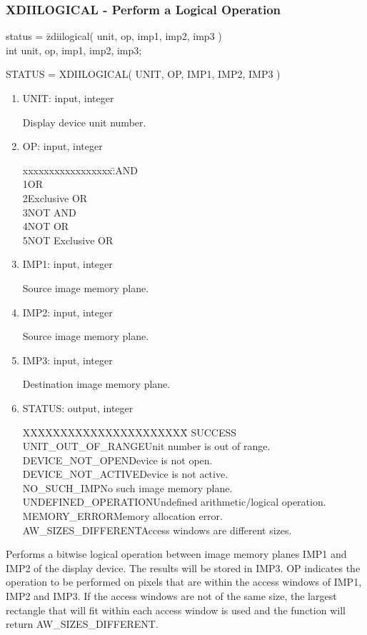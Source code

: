 \subsubsection{XDIILOGICAL - Perform a Logical Operation}
\begin{tabbing}
status = \=zdiilogical( unit, op, imp1, imp2, imp3 )\\
\>int  unit, op, imp1, imp2, imp3;\\
\end{tabbing}
STATUS = XDIILOGICAL( UNIT, OP, IMP1, IMP2, IMP3 )
\begin{enumerate}
\item UNIT:  input, integer

Display device unit number.
\item OP:  input, integer
\begin{tabbing}
xxxxxxxxxxxxxxxxx:\=\>AND\\
1\>OR\\
2\>Exclusive OR\\
3\>NOT AND\\
4\>NOT OR\\
5\>NOT Exclusive OR\\
\end{tabbing}
\item IMP1:  input, integer

Source image memory plane.
\item IMP2:  input, integer

Source image memory plane.
\item IMP3:  input, integer

Destination image memory plane.
\item STATUS:  output, integer
\begin{tabbing}
XXXXXXXXXXXXXXXXXXXXXX\=\kill
SUCCESS\\
UNIT\_OUT\_OF\_RANGE\>Unit number is out of range.\\
DEVICE\_NOT\_OPEN\>Device is not open.\\
DEVICE\_NOT\_ACTIVE\>Device is not active.\\
NO\_SUCH\_IMP\>No such image memory plane.\\
UNDEFINED\_OPERATION\>Undefined arithmetic/logical operation.\\
MEMORY\_ERROR\>Memory allocation error.\\
AW\_SIZES\_DIFFERENT\>Access windows are different sizes.\\
\end{tabbing}
\end{enumerate}
Performs a bitwise logical operation between image memory planes IMP1 and
IMP2 of the display device.  The results will be stored in IMP3.  OP
indicates the operation to be performed on pixels that are within the
access windows of IMP1, IMP2 and IMP3.  If the access windows are not of
the same size, the largest rectangle that will fit within each access
window is used and the function will return AW\_SIZES\_DIFFERENT.
\newpage
